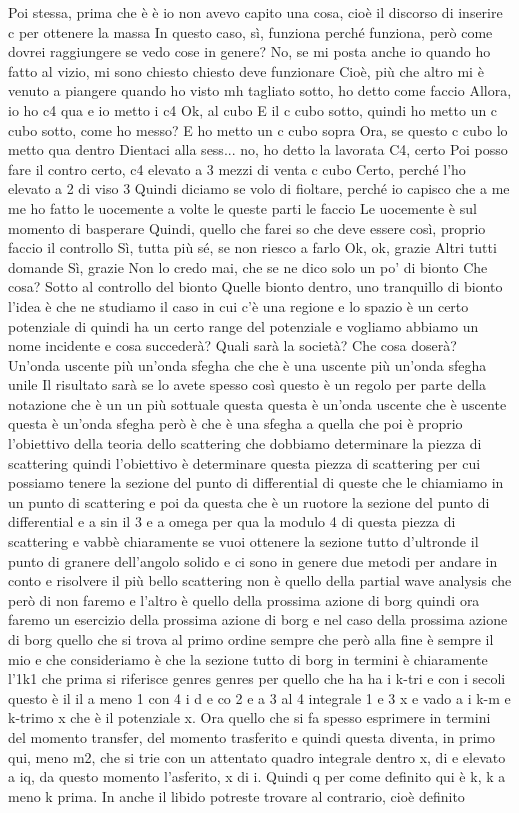 {\begin{soluzione}
   Poi stessa, prima che è è io non avevo capito una cosa, cioè il discorso di inserire c per ottenere la massa In questo caso, sì, funziona perché funziona, però come dovrei raggiungere se vedo cose in genere? No, se mi posta anche io quando ho fatto al vizio, mi sono chiesto chiesto deve funzionare Cioè, più che altro mi è venuto a piangere quando ho visto mh tagliato sotto, ho detto come faccio Allora, io ho c4 qua e io metto i c4 Ok, al cubo E il c cubo sotto, quindi ho metto un c cubo sotto, come ho messo? E ho metto un c cubo sopra Ora, se questo c cubo lo metto qua dentro Dientaci alla sess... no, ho detto la lavorata C4, certo Poi posso fare il contro certo, c4 elevato a 3 mezzi di venta c cubo Certo, perché l'ho elevato a 2 di viso 3 Quindi diciamo se volo di fioltare, perché io capisco che a me me ho fatto le uocemente a volte le queste parti le faccio Le uocemente è sul momento di basperare Quindi, quello che farei so che deve essere così, proprio faccio il controllo Sì, tutta più sé, se non riesco a farlo Ok, ok, grazie Altri tutti domande Sì, grazie Non lo credo mai, che se ne dico solo un po' di bionto Che cosa? Sotto al controllo del bionto Quelle bionto dentro, uno tranquillo di bionto l'idea è che ne studiamo il caso in cui c'è una regione e lo spazio è un certo potenziale di quindi ha un certo range del potenziale e vogliamo abbiamo un nome incidente e cosa succederà? Quali sarà la società? Che cosa doserà? Un'onda uscente più un'onda sfegha che che è una uscente più un'onda sfegha unile Il risultato sarà se lo avete spesso così questo è un regolo per parte della notazione che è un un più sottuale questa questa è un'onda uscente che è uscente questa è un'onda sfegha però è che è una sfegha a quella che poi è proprio l'obiettivo della teoria dello scattering che dobbiamo determinare la piezza di scattering quindi l'obiettivo è determinare questa piezza di scattering per cui possiamo tenere la sezione del punto di differential di queste che le chiamiamo in un punto di scattering e poi da questa che è un ruotore la sezione del punto di differential e a sin il 3 e a omega per qua la modulo 4 di questa piezza di scattering e vabbè chiaramente se vuoi ottenere la sezione tutto d'ultronde il punto di granere dell'angolo solido e ci sono in genere due metodi per andare in conto e risolvere il più bello scattering non è quello della partial wave analysis che però di non faremo e l'altro è quello della prossima azione di borg quindi ora faremo un esercizio della prossima azione di borg e nel caso della prossima azione di borg quello che si trova al primo ordine sempre che però alla fine è sempre il mio e che consideriamo è che la sezione tutto di borg in termini è chiaramente l'1k1 che prima si riferisce genres genres per quello che ha ha i k-tri e con i secoli questo è il il a meno 1 con 4 i d e co 2 e a 3 al 4 integrale 1 e 3 x e vado a i k-m e k-trimo x che è il potenziale x. Ora quello che si fa spesso esprimere in termini del momento transfer, del momento trasferito e quindi questa diventa, in primo qui, meno m2, che si trie con un attentato quadro integrale dentro x, di e elevato a iq, da questo momento l'asferito, x di i. Quindi q per come definito qui è k, k a meno k prima. In anche il libido potreste trovare al contrario, cioè definito 
\end{soluzione}}
